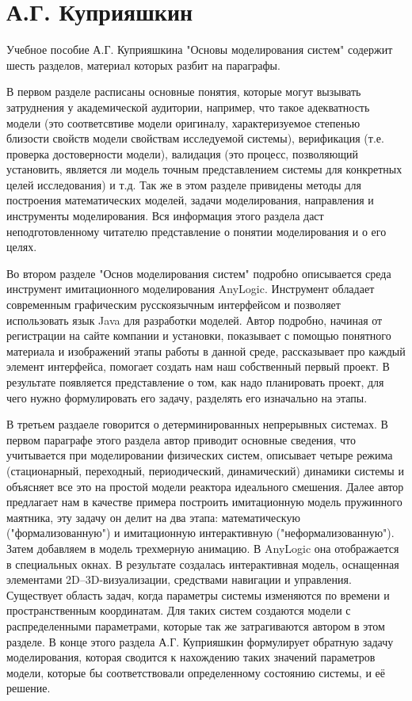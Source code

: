 \documentclass[a4paper,14pt]{report} %
\begin{document}
\section{А.Г. Куприяшкин}
Учебное пособие А.Г. Куприяшкина "Основы моделирования систем" содержит шесть разделов, материал которых разбит на параграфы. 

В первом разделе расписаны основные понятия, которые могут вызывать затруднения у академической аудитории, например, что такое адекватность модели (это соответсвтиве модели оригиналу, характеризуемое степенью близости свойств модели свойствам исследуемой системы),  верификация (т.е. проверка достоверности модели), валидация (это процесс, позволяющий установить, является ли модель точным представлением системы для конкретных целей исследования) и т.д. Так же в этом разделе привидены методы для построения математических моделей, задачи моделирования, направления и инструменты моделирования. Вся информация этого раздела даст неподготовленному читателю представление о понятии моделирования и о его целях. 

Во втором разделе "Основ моделирования систем" подробно описывается среда инструмент имитационного моделирования AnyLogic. Инструмент обладает современным графическим русскоязычным интерфейсом и позволяет использовать язык Java для разработки моделей. Автор подробно, начиная от регистрации на сайте компании и установки, показывает с помощью понятного материала и изображений этапы работы в данной среде, рассказывает про каждый элемент интерфейса, помогает создать нам наш собственный первый проект. В результате появляется представление о том, как надо планировать проект, для чего нужно формулировать его задачу, разделять его изначально на этапы.

В третьем раздаеле говорится о детерминированных непрерывных системах. В первом параграфе этого раздела автор приводит основные сведения, что учитывается при моделировании физических систем, описывает четыре режима (стационарный, переходный, периодический, динамический) динамики системы и объясняет все это на простой модели реактора идеального смешения.  Далее автор предлагает нам в качестве примера построить имитационную модель пружинного маятника, эту задачу он делит на два этапа: математическую ("формализованную") и имитационную интерактивную ("неформализованную"). Затем добавляем в модель трехмерную анимацию. В AnyLogic
она отображается в специальных окнах. В результате создалась интерактивная модель, оснащенная элементами 2D–3D-визуализации, средствами навигации и управления. Существует область задач, когда параметры системы изменяются по времени и пространственным координатам. Для таких систем создаются модели с распределенными параметрами, которые так же затрагиваются автором в этом разделе. В конце этого раздела А.Г. Куприяшкин формулирует обратную задачу моделирования, которая сводится к нахождению таких значений параметров модели, которые бы соответствовали определенному состоянию системы, и её решение.
\end{document}
